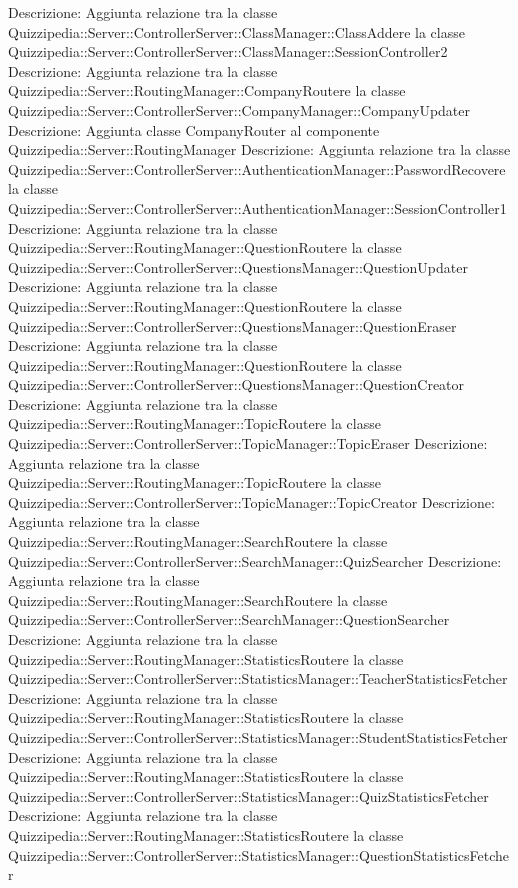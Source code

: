 Descrizione: Aggiunta relazione tra la classe Quizzipedia::Server::ControllerServer::ClassManager::ClassAddere la classe Quizzipedia::Server::ControllerServer::ClassManager::SessionController2 
Descrizione: Aggiunta relazione tra la classe Quizzipedia::Server::RoutingManager::CompanyRoutere la classe Quizzipedia::Server::ControllerServer::CompanyManager::CompanyUpdater 
Descrizione: Aggiunta classe CompanyRouter al componente Quizzipedia::Server::RoutingManager 
Descrizione: Aggiunta relazione tra la classe Quizzipedia::Server::ControllerServer::AuthenticationManager::PasswordRecovere la classe Quizzipedia::Server::ControllerServer::AuthenticationManager::SessionController1 
Descrizione: Aggiunta relazione tra la classe Quizzipedia::Server::RoutingManager::QuestionRoutere la classe Quizzipedia::Server::ControllerServer::QuestionsManager::QuestionUpdater 
Descrizione: Aggiunta relazione tra la classe Quizzipedia::Server::RoutingManager::QuestionRoutere la classe Quizzipedia::Server::ControllerServer::QuestionsManager::QuestionEraser 
Descrizione: Aggiunta relazione tra la classe Quizzipedia::Server::RoutingManager::QuestionRoutere la classe Quizzipedia::Server::ControllerServer::QuestionsManager::QuestionCreator 
Descrizione: Aggiunta relazione tra la classe Quizzipedia::Server::RoutingManager::TopicRoutere la classe Quizzipedia::Server::ControllerServer::TopicManager::TopicEraser 
Descrizione: Aggiunta relazione tra la classe Quizzipedia::Server::RoutingManager::TopicRoutere la classe Quizzipedia::Server::ControllerServer::TopicManager::TopicCreator 
Descrizione: Aggiunta relazione tra la classe Quizzipedia::Server::RoutingManager::SearchRoutere la classe Quizzipedia::Server::ControllerServer::SearchManager::QuizSearcher 
Descrizione: Aggiunta relazione tra la classe Quizzipedia::Server::RoutingManager::SearchRoutere la classe Quizzipedia::Server::ControllerServer::SearchManager::QuestionSearcher 
Descrizione: Aggiunta relazione tra la classe Quizzipedia::Server::RoutingManager::StatisticsRoutere la classe Quizzipedia::Server::ControllerServer::StatisticsManager::TeacherStatisticsFetcher 
Descrizione: Aggiunta relazione tra la classe Quizzipedia::Server::RoutingManager::StatisticsRoutere la classe Quizzipedia::Server::ControllerServer::StatisticsManager::StudentStatisticsFetcher 
Descrizione: Aggiunta relazione tra la classe Quizzipedia::Server::RoutingManager::StatisticsRoutere la classe Quizzipedia::Server::ControllerServer::StatisticsManager::QuizStatisticsFetcher 
Descrizione: Aggiunta relazione tra la classe Quizzipedia::Server::RoutingManager::StatisticsRoutere la classe Quizzipedia::Server::ControllerServer::StatisticsManager::QuestionStatisticsFetcher 
